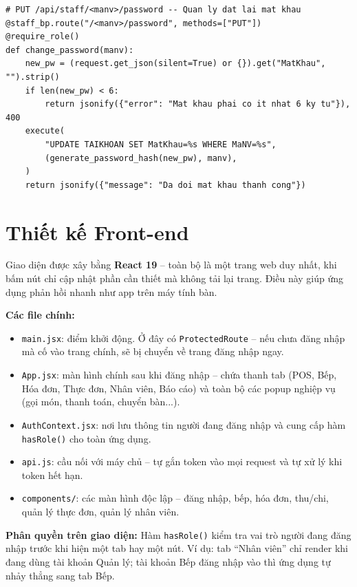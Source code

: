 \documentclass[12pt,a4paper]{report}
\newcommand{\code}[1]{\texttt{#1}}
\begin{document}
\begin{lstlisting}[style=mypython,
  caption={File \texttt{staff.py} -- Quản lý nhân viên và tài khoản (chỉ Quản lý)},
  label=lst:python-staff]
# PUT /api/staff/<manv>/password -- Quan ly dat lai mat khau
@staff_bp.route("/<manv>/password", methods=["PUT"])
@require_role()
def change_password(manv):
    new_pw = (request.get_json(silent=True) or {}).get("MatKhau", "").strip()
    if len(new_pw) < 6:
        return jsonify({"error": "Mat khau phai co it nhat 6 ky tu"}), 400
    execute(
        "UPDATE TAIKHOAN SET MatKhau=%s WHERE MaNV=%s",
        (generate_password_hash(new_pw), manv),
    )
    return jsonify({"message": "Da doi mat khau thanh cong"})
\end{lstlisting}

\section{Thiết kế Front-end}

Giao diện được xây bằng \textbf{React 19} -- toàn bộ là một trang web duy nhất, khi bấm nút chỉ cập nhật phần cần thiết mà không tải lại trang. Điều này giúp ứng dụng phản hồi nhanh như app trên máy tính bàn.

\textbf{Các file chính:}
\begin{itemize}
  \item \code{main.jsx}: điểm khởi động. Ở đây có \code{ProtectedRoute} -- nếu chưa đăng nhập mà cố vào trang chính, sẽ bị chuyển về trang đăng nhập ngay.
  \item \code{App.jsx}: màn hình chính sau khi đăng nhập -- chứa thanh tab (POS, Bếp, Hóa đơn, Thực đơn, Nhân viên, Báo cáo) và toàn bộ các popup nghiệp vụ (gọi món, thanh toán, chuyển bàn...).
  \item \code{AuthContext.jsx}: nơi lưu thông tin người đang đăng nhập và cung cấp hàm \code{hasRole()} cho toàn ứng dụng.
  \item \code{api.js}: cầu nối với máy chủ -- tự gắn token vào mọi request và tự xử lý khi token hết hạn.
  \item \code{components/}: các màn hình độc lập -- đăng nhập, bếp, hóa đơn, thu/chi, quản lý thực đơn, quản lý nhân viên.
\end{itemize}

\textbf{Phân quyền trên giao diện:} Hàm \code{hasRole()} kiểm tra vai trò người đang đăng nhập trước khi hiện một tab hay một nút. Ví dụ: tab ``Nhân viên'' chỉ render khi đang dùng tài khoản Quản lý; tài khoản Bếp đăng nhập vào thì ứng dụng tự nhảy thẳng sang tab Bếp.
\end{document}
